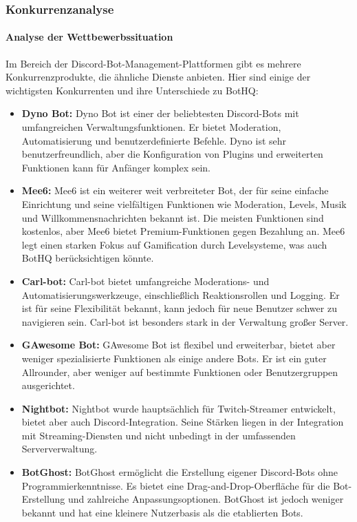 \subsubsection{Konkurrenzanalyse}\label{konkurrenzanalyse}

\paragraph{Analyse der Wettbewerbssituation}
Im Bereich der Discord-Bot-Management-Plattformen gibt es mehrere Konkurrenzprodukte, die ähnliche Dienste anbieten. Hier sind einige der wichtigsten Konkurrenten und ihre Unterschiede zu BotHQ:

\begin{itemize}
  \item \textbf{Dyno Bot:}
  Dyno Bot ist einer der beliebtesten Discord-Bots mit umfangreichen Verwaltungsfunktionen. Er bietet Moderation, Automatisierung und benutzerdefinierte Befehle. Dyno ist sehr benutzerfreundlich, aber die Konfiguration von Plugins und erweiterten Funktionen kann für Anfänger komplex sein.

  \item \textbf{Mee6:}
  Mee6 ist ein weiterer weit verbreiteter Bot, der für seine einfache Einrichtung und seine vielfältigen Funktionen wie Moderation, Levels, Musik und Willkommensnachrichten bekannt ist. Die meisten Funktionen sind kostenlos, aber Mee6 bietet Premium-Funktionen gegen Bezahlung an. Mee6 legt einen starken Fokus auf Gamification durch Levelsysteme, was auch BotHQ berücksichtigen könnte.

  \item \textbf{Carl-bot:}
  Carl-bot bietet umfangreiche Moderations- und Automatisierungswerkzeuge, einschließlich Reaktionsrollen und Logging. Er ist für seine Flexibilität bekannt, kann jedoch für neue Benutzer schwer zu navigieren sein. Carl-bot ist besonders stark in der Verwaltung großer Server.

  \item \textbf{GAwesome Bot:}
  GAwesome Bot ist flexibel und erweiterbar, bietet aber weniger spezialisierte Funktionen als einige andere Bots. Er ist ein guter Allrounder, aber weniger auf bestimmte Funktionen oder Benutzergruppen ausgerichtet.

  \item \textbf{Nightbot:}
  Nightbot wurde hauptsächlich für Twitch-Streamer entwickelt, bietet aber auch Discord-Integration. Seine Stärken liegen in der Integration mit Streaming-Diensten und nicht unbedingt in der umfassenden Serververwaltung.

  \item \textbf{BotGhost:}
  BotGhost ermöglicht die Erstellung eigener Discord-Bots ohne Programmierkenntnisse. Es bietet eine Drag-and-Drop-Oberfläche für die Bot-Erstellung und zahlreiche Anpassungsoptionen. BotGhost ist jedoch weniger bekannt und hat eine kleinere Nutzerbasis als die etablierten Bots.
\end{itemize}

